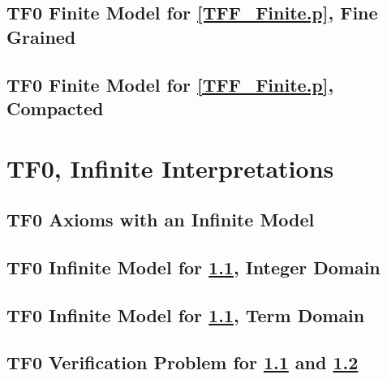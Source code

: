 \documentclass{easychair}
\begin{document}
\newpage
\subsection{TF0 Finite Model for \ref{TFF_Finite.p}, Fine Grained}
\label{TFF_Finite_Fine.s}
\begin{small}

\end{small}

\newpage
\subsection{TF0 Finite Model for \ref{TFF_Finite.p}, Compacted}
\label{TFF_Finite_Compact.s}
\begin{small}

\end{small}

\newpage
\section{TF0, Infinite Interpretations}
\label{TF0Infinite}

\subsection{TF0 Axioms with an Infinite Model}
\label{TFF_Infinite.p}
\begin{small}

\end{small}

\newpage
\subsection{TF0 Infinite Model for \ref{TFF_Infinite.p}, Integer Domain}
\label{TFF_Integer.s}
\begin{small}

\end{small}

\newpage
\subsection{TF0 Infinite Model for \ref{TFF_Infinite.p}, Term Domain}
\label{TFF_Peano.s}
\begin{small}

\end{small}

\newpage
\subsection{TF0 Verification Problem for \ref{TFF_Infinite.p} and \ref{TFF_Integer.s}}
\label{TFF_Integer.s.p}
\begin{small}

\end{small}
\end{document}
